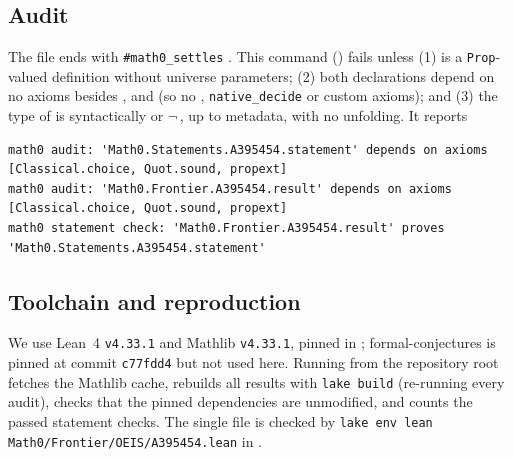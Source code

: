 \documentclass[11pt]{amsart}
\theoremstyle{plain}
\theoremstyle{definition}
\begin{document}
\subsection*{Audit}
The file ends with \texttt{\#math0\_settles}  . This command () fails unless (1)  is a \texttt{Prop}-valued definition without universe parameters; (2) both declarations depend on no axioms besides ,  and  (so no , \texttt{native\_decide} or custom axioms); and (3) the type of  is syntactically  or $\neg$\,, up to metadata, with no unfolding. It reports
\begin{lstlisting}[basicstyle=\ttfamily\scriptsize]
math0 audit: 'Math0.Statements.A395454.statement' depends on axioms [Classical.choice, Quot.sound, propext]
math0 audit: 'Math0.Frontier.A395454.result' depends on axioms [Classical.choice, Quot.sound, propext]
math0 statement check: 'Math0.Frontier.A395454.result' proves 'Math0.Statements.A395454.statement'
\end{lstlisting}

\subsection*{Toolchain and reproduction}
We use Lean~4 \cite{Lean4} \texttt{v4.33.1} and Mathlib \cite{Mathlib} \texttt{v4.33.1}, pinned in ; formal-conjectures \cite{FC} is pinned at commit \texttt{c77fdd4} but not used here. Running  from the repository root fetches the Mathlib cache, rebuilds all results with \texttt{lake build} (re-running every audit), checks that the pinned dependencies are unmodified, and counts the passed statement checks. The single file is checked by \texttt{lake env lean Math0/Frontier/OEIS/A395454.lean} in .
\end{document}

